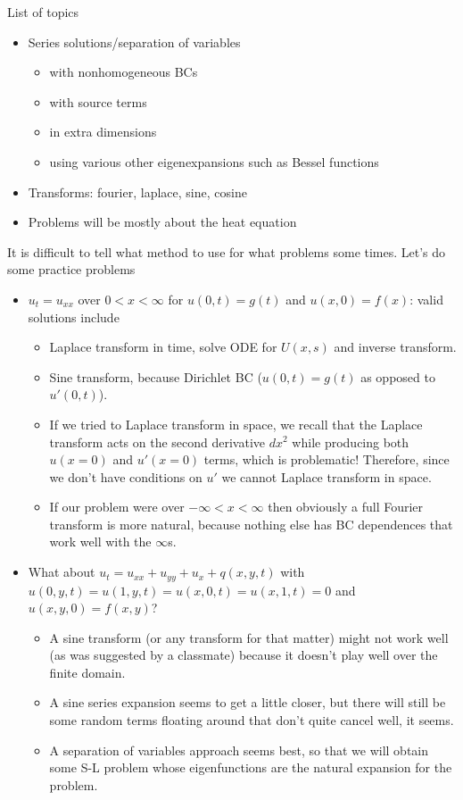 \documentclass[10pt]{article}
\begin{document}
\pagestyle{fancy}

List of topics
\begin{itemize}
    \item Series solutions/separation of variables
        \begin{itemize}
            \item with nonhomogeneous BCs
            \item with source terms
            \item in extra dimensions
            \item using various other eigenexpansions such as Bessel functions
        \end{itemize}
    \item Transforms: fourier, laplace, sine, cosine
    \item Problems will be mostly about the heat equation
\end{itemize}

It is difficult to tell what method to use for what problems some times. Let's do some practice problems
\begin{itemize}
    \item $u_t = u_{xx}$ over $0 < x < \infty$ for $u(0,t) = g(t)$ and $u(x,0) = f(x)$: valid solutions include
        \begin{itemize}
            \item Laplace transform in time, solve ODE for $U(x,s)$ and inverse transform.
            \item Sine transform, because Dirichlet BC ($u(0,t) = g(t)$ as opposed to $u'(0,t)$).
            \item If we tried to Laplace transform in space, we recall that the Laplace transform acts on the second derivative $dx^2$ while producing both $u(x=0)$ and $u'(x=0)$ terms, which is problematic! Therefore, since we don't have conditions on $u'$ we cannot Laplace transform in space.
            \item If our problem were over $-\infty < x < \infty$ then obviously a full Fourier transform is more natural, because nothing else has BC dependences that work well with the $\infty$s.
        \end{itemize}
    \item What about $u_t = u_{xx} + u_{yy} + u_x + q(x,y,t)$ with $u(0,y,t) = u(1,y,t) = u(x,0,t) = u(x,1,t) = 0$ and $u(x,y,0) = f(x,y)$?
        \begin{itemize}
            \item A sine transform (or any transform for that matter) might not work well (as was suggested by a classmate) because it doesn't play well over the finite domain.
            \item A sine series expansion seems to get a little closer, but there will still be some random terms floating around that don't quite cancel well, it seems.
            \item A separation of variables approach seems best, so that we will obtain some S-L problem whose eigenfunctions are the natural expansion for the problem. 
        \end{itemize}
\end{itemize}
\end{document}
